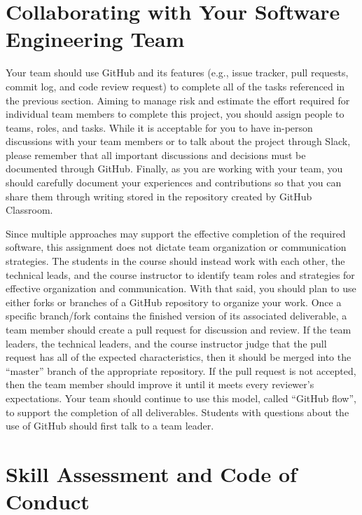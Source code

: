 \documentclass[11pt]{article}
\begin{document}
\section*{Collaborating with Your Software Engineering Team}

Your team should use GitHub and its features (e.g., issue tracker, pull
requests, commit log, and code review request) to complete all of the tasks
referenced in the previous section.
%
Aiming to manage risk and estimate the effort required for individual team
members to complete this project, you should assign people to teams, roles, and
tasks. While it is acceptable for you to have in-person discussions with your
team members or to talk about the project through Slack, please remember that
all important discussions and decisions must be documented through GitHub.
Finally, as you are working with your team, you should carefully document your
experiences and contributions so that you can share them through writing stored
in the repository created by GitHub Classroom.

Since multiple approaches may support the effective completion of the required
software, this assignment does not dictate team organization or communication
strategies. The students in the course should instead work with each other, the
technical leads, and the course instructor to identify team roles and strategies
for effective organization and communication. With that said, you should plan to
use either forks or branches of a GitHub repository to organize your work.
%
Once a specific branch/fork contains the finished version of its associated
deliverable, a team member should create a pull request for discussion and
review. If the team leaders, the technical leaders, and the course instructor
judge that the pull request has all of the expected characteristics, then it
should be merged into the ``master'' branch of the appropriate repository. If
the pull request is not accepted, then the team member should improve it until
it meets every reviewer's expectations. Your team should continue to use this
model, called ``GitHub flow'', to support the completion of all deliverables.
%
Students with questions about the use of GitHub should first talk to a team
leader.

\section*{Skill Assessment and Code of Conduct}

\end{document}

